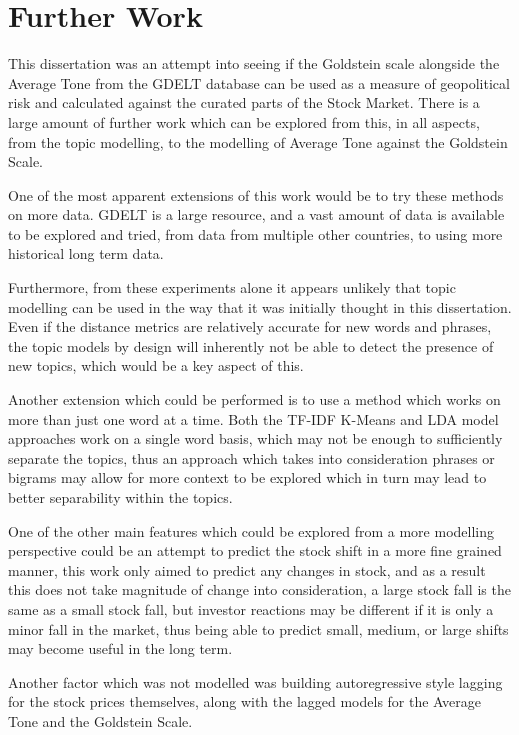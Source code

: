 \section{Further Work}
This dissertation was an attempt into seeing if the Goldstein scale alongside the Average Tone from the GDELT database can be used as a measure of geopolitical risk and calculated against the curated parts of the Stock Market. There is a large amount of further work which can be explored from this, in all aspects, from the topic modelling, to the modelling of Average Tone against the Goldstein Scale. 

One of the most apparent extensions of this work would be to try these methods on more data. GDELT is a large resource, and a vast amount of data is available to be explored and tried, from data from multiple other countries, to using more historical long term data. 

Furthermore, from these experiments alone it appears unlikely that topic modelling can be used in the way that it was initially thought in this dissertation. Even if the distance metrics are relatively accurate for new words and phrases, the topic models by design will inherently not be able to detect the presence of new topics, which would be a key aspect of this.

Another extension which could be performed is to use a method which works on more than just one word at a time. Both the TF-IDF K-Means and LDA model approaches work on a single word basis, which may not be enough to sufficiently separate the topics, thus an approach which takes into consideration phrases or bigrams may allow for more context to be explored which in turn may lead to better separability within the topics. 

One of the other main features which could be explored from a more modelling perspective could be an attempt to predict the stock shift in a more fine grained manner, this work only aimed to predict any changes in stock, and as a result this does not take magnitude of change into consideration, a large stock fall is the same as a small stock fall, but investor reactions may be different if it is only a minor fall in the market, thus being able to predict small, medium, or large shifts may become useful in the long term. 

Another factor which was not modelled was building autoregressive style lagging for the stock prices themselves, along with the lagged models for the Average Tone and the Goldstein Scale. 

